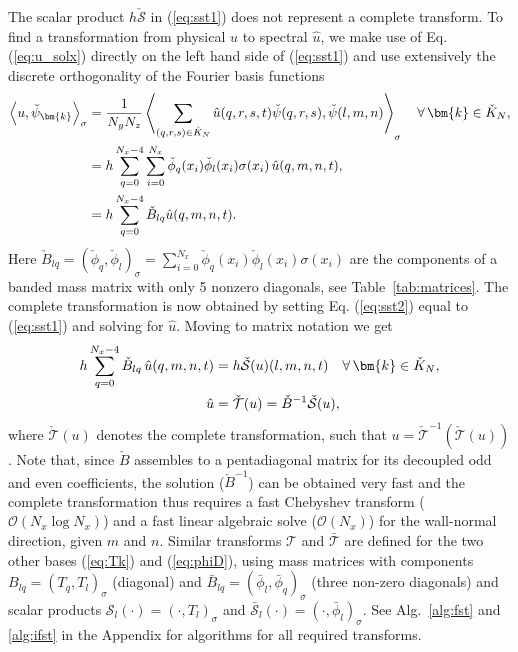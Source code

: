 \documentclass[preprint]{elsarticle}
\newcommand{\N}[1]{\check{#1}}
\newcommand{\D}[1]{\bar{#1}}
\begin{document}
The scalar product  $h\N{\mathcal{S}}$ in (\ref{eq:sst1}) does not represent a 
complete transform. To find a transformation from physical $u$ to spectral 
$\hat{u}$, we make use of Eq. (\ref{eq:u_solx}) directly on the left hand side of (\ref{eq:sst1}) and use extensively the discrete 
orthogonality of the Fourier basis functions
\begin{align}
\left<u, \N{\psi}_{\bm{k}}\right>_{\sigma} &= \frac{1}{N_yN_z}\left< 
\sum_{(q,r,s) \in \N{K}_N} \hat{u}(q,r,s,t) \N{\psi}(q,r,s), 
\N{\psi}(l,m,n) \right>_{\sigma} \quad \forall \, \bm{k} \in \N{K}_N, \notag \\
           &= h \sum_{q=0}^{N_x-4} \sum_{i=0}^{N_x} \N{\phi}_{q}(x_i) 
           \N{\phi}_{l}(x_i) \sigma(x_i) \, \hat{u}(q, {m}, {n}, t), \notag \\
           &= h \sum_{q=0}^{N_x-4} \N{B}_{lq} \hat{u}(q, {m}, {n}, t). 
           \label{eq:sst2}
\end{align}
Here $\N{B}_{lq} = (\N{\phi}_q, \N{\phi}_l)_{\sigma} = 
\sum_{i=0}^{N_x} \N{\phi}_{q}(x_i) \N{\phi}_{l}(x_i) \sigma(x_i)$ are the components of a 
banded mass matrix with only 5 nonzero diagonals, see Table~\ref{tab:matrices}. The complete transformation is now obtained by 
setting Eq. (\ref{eq:sst2}) equal to (\ref{eq:sst1}) and solving for $\hat{u}$. 
Moving to matrix notation we get
\begin{align}
h\sum_{q=0}^{N_x-4} \N{B}_{lq}\, \hat{u}(q, {m}, {n}, t) &= 
h\N{\mathcal{S}}(u)(l, m, n, t)  \quad \forall \, \bm{k} \in \N{K}_N, \notag \\
 \hat{u} &= \N{\mathcal{T}}(u) =  \N{B}^{-1}\N{\mathcal{S}}(u), \label{eq:fstB}
\end{align}
where $\N{\mathcal{T}}(u)$ denotes the complete transformation, such that $u = 
\N{\mathcal{T}}^{-1}(\N{\mathcal{T}}(u))$. Note that, since $\N{B}$ assembles to 
a pentadiagonal matrix for its decoupled odd and even coefficients, the solution ($\N{B}^{-1}$) can be obtained very fast and the complete 
transformation thus requires a fast Chebyshev transform ($\mathcal{O}(N_x \log N_x)$) and 
a fast linear algebraic solve ($\mathcal{O}(N_x)$) for the wall-normal direction, given $m$ and $n$. Similar transforms $\mathcal{T}$ 
and $\D{\mathcal{T}}$ are defined for the two other bases (\ref{eq:Tk}) and 
(\ref{eq:phiD}), using mass matrices with components $B_{lq}=(T_q, T_l)_{\sigma}$ (diagonal) and 
$\D{B}_{lq}=(\D{\phi}_l, \D{\phi}_q)_{\sigma}$ (three non-zero diagonals) and scalar products 
$\mathcal{S}_l(\cdot) = (\cdot, T_l)_{\sigma}$ and $\D{\mathcal{S}}_l(\cdot) = (\cdot, 
\D{\phi}_l)_{\sigma}$. See Alg.~\ref{alg:fst} and \ref{alg:ifst} in the Appendix for algorithms for all required transforms.
\end{document}
